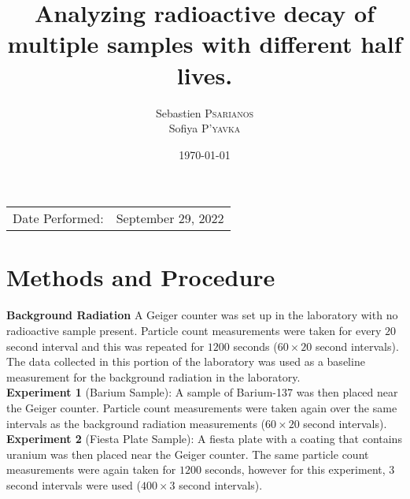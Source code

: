 \documentclass[
	letterpaper, %
	10pt, %
]{CSUniSchoolLabReport}
\title{Analyzing radioactive decay of multiple samples with different half lives.}
\author{Sebastien \textsc{Psarianos}\\ Sofiya \textsc{P'yavka}}
\date{\today}
\begin{document}
\maketitle

\begin{center}
	\begin{tabular}{l r}
		Date Performed: & September 29, 2022 \\
	\end{tabular}
\end{center}

\vspace{20pt}
\section{Methods and Procedure}
\vspace{20pt}
\textbf{Background Radiation} A Geiger counter was set up in the laboratory with no radioactive sample present. Particle count measurements were taken for every $20$ second interval and this was repeated for $1200$ seconds ($60\times20$ second intervals). The data collected in this portion of the laboratory was used as a baseline measurement for the background radiation in the laboratory.\\

\textbf{Experiment 1} (Barium Sample): A sample of Barium-137 was then placed near the Geiger counter. Particle count measurements were taken again over the same intervals as the background radiation measurements ($60\times20$ second intervals).\\

\textbf{Experiment 2} (Fiesta Plate Sample): A fiesta plate with a coating that contains uranium was then placed near the Geiger counter. The same particle count measurements were again taken for $1200$ seconds, however for this experiment, $3$ second intervals were used ($400\times3$ second intervals).
\vspace{20pt}
\end{document}
